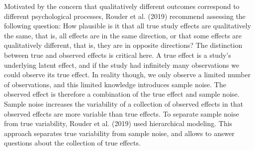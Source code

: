 \documentclass[english,,man]{apa6}
\begin{document}
Motivated by the concern that qualitatively different outcomes correspond to different psychological processes, Rouder et al. (2019) recommend assessing the following question: How plausible is it that all true study effects are qualitatively the same, that is, all effects are in the same direction, or that some effects are qualitatively different, that is, they are in opposite directions? The distinction between true and observed effects is critical here. A true effect is a study's underlying latent effect, and if the study had infinitely many observations we could observe its true effect. In reality though, we only observe a limited number of observations, and this limited knowledge introduces sample noise. The observed effect is therefore a combination of the true effect and sample noise. Sample noise increases the variability of a collection of observed effects in that observed effects are more variable than true effects. To separate sample noise from true variability, Rouder et al. (2019) used hierarchical modeling. This approach separates true variability from sample noise, and allows to answer questions about the collection of true effects.
\end{document}

